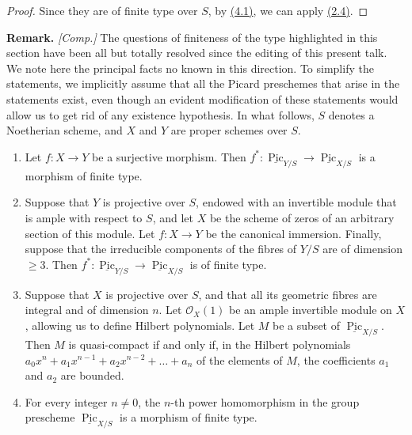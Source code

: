 \documentclass{article}
\newenvironment{rmenv}[1]
  {\phantomsection\par\smallskip\noindent\textbf{#1.}\rmfamily}
  {\par\smallskip}
\newcommand{\oldpage}[1]{\marginpar{\footnotesize$\Big\vert$ \textit{p.~#1}}}
\theoremstyle{definition}
\theoremstyle{definition}
\theoremstyle{definition}
\theoremstyle{definition}
\theoremstyle{remark}
\begin{document}
\begin{proof}
Since they are of finite type over \(S\), by \protect\hyperlink{fga-3-vi-theorem-4.1}{(4.1)}, we can apply \protect\hyperlink{fga-3-vi-corollary-2.4}{(2.4)}.
\end{proof}

\leavevmode{}%
\begin{rmenv}{Remark}
\emph{{[}Comp.{]}}
\oldpage{C-07}The questions of finiteness of the type highlighted in this section have been all but totally resolved since the editing of this present talk.
We note here the principal facts no known in this direction.
To simplify the statements, we implicitly assume that all the Picard preschemes that arise in the statements exist, even though an evident modification of these statements would allow us to get rid of any existence hypothesis.
In what follows, \(S\) denotes a Noetherian scheme, and \(X\) and \(Y\) are proper schemes over \(S\).

\begin{enumerate}
\def\labelenumi{\roman{enumi}.}
\item
  Let \(f\colon X\to Y\) be a surjective morphism.
  Then \(f^*\colon\underline{\operatorname{Pic}}_{Y/S}\to\underline{\operatorname{Pic}}_{X/S}\) is a morphism of finite type.
\item
  \oldpage{C-08}Suppose that \(Y\) is projective over \(S\), endowed with an invertible module that is ample with respect to \(S\), and let \(X\) be the scheme of zeros of an arbitrary section of this module.
  Let \(f\colon X\to Y\) be the canonical immersion.
  Finally, suppose that the irreducible components of the fibres of \(Y/S\) are of dimension \(\geqslant 3\).
  Then \(f^*\colon\underline{\operatorname{Pic}}_{Y/S}\to\underline{\operatorname{Pic}}_{X/S}\) is of finite type.
\item
  Suppose that \(X\) is projective over \(S\), and that all its geometric fibres are integral and of dimension \(n\).
  Let \({\mathscr{O}}_X(1)\) be an ample invertible module on \(X\), allowing us to define Hilbert polynomials.
  Let \(M\) be a subset of \(\underline{\operatorname{Pic}}_{X/S}\).
  Then \(M\) is quasi-compact if and only if, in the Hilbert polynomials \(a_0x^n+a_1x^{n-1}+a_2x^{n-2}+\ldots+a_n\) of the elements of \(M\), the coefficients \(a_1\) and \(a_2\) are bounded.
\item
  For every integer \(n\neq0\), the \(n\)-th power homomorphism in the group prescheme \(\underline{\operatorname{Pic}}_{X/S}\) is a morphism of finite type.
\end{enumerate}


\end{rmenv}
\end{document}
